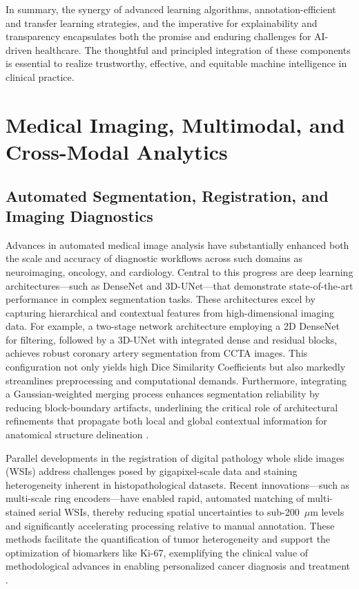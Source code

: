 \documentclass[sigconf]{acmart}
\begin{document}
In summary, the synergy of advanced learning algorithms, annotation-efficient and transfer learning strategies, and the imperative for explainability and transparency encapsulates both the promise and enduring challenges for AI-driven healthcare. The thoughtful and principled integration of these components is essential to realize trustworthy, effective, and equitable machine intelligence in clinical practice.

\section{Medical Imaging, Multimodal, and Cross-Modal Analytics}

\subsection{Automated Segmentation, Registration, and Imaging Diagnostics}

Advances in automated medical image analysis have substantially enhanced both the scale and accuracy of diagnostic workflows across such domains as neuroimaging, oncology, and cardiology. Central to this progress are deep learning architectures—such as DenseNet and 3D-UNet—that demonstrate state-of-the-art performance in complex segmentation tasks. These architectures excel by capturing hierarchical and contextual features from high-dimensional imaging data. For example, a two-stage network architecture employing a 2D DenseNet for filtering, followed by a 3D-UNet with integrated dense and residual blocks, achieves robust coronary artery segmentation from CCTA images. This configuration not only yields high Dice Similarity Coefficients but also markedly streamlines preprocessing and computational demands. Furthermore, integrating a Gaussian-weighted merging process enhances segmentation reliability by reducing block-boundary artifacts, underlining the critical role of architectural refinements that propagate both local and global contextual information for anatomical structure delineation \cite{ref94}.

Parallel developments in the registration of digital pathology whole slide images (WSIs) address challenges posed by gigapixel-scale data and staining heterogeneity inherent in histopathological datasets. Recent innovations—such as multi-scale ring encoders—have enabled rapid, automated matching of multi-stained serial WSIs, thereby reducing spatial uncertainties to sub-200~$\mu$m levels and significantly accelerating processing relative to manual annotation. These methods facilitate the quantification of tumor heterogeneity and support the optimization of biomarkers like Ki-67, exemplifying the clinical value of methodological advances in enabling personalized cancer diagnosis and treatment \cite{ref100}.
\end{document}
